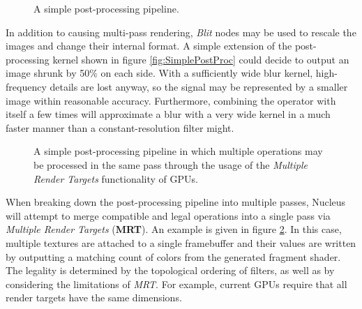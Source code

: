 \begin{figure}[h!]
  \centering
  \caption[Simple post-processing with breakdown]{A simple post-processing pipeline.}
\label{fig:SimplePostProcWithBreakdown}
\end{figure}

In addition to causing multi-pass rendering, \emph{Blit} nodes may be used to rescale the images and change their internal format. A simple extension of the post-processing kernel shown in figure \ref{fig:SimplePostProc} could decide to output an image shrunk by 50\% on each side. With a sufficiently wide blur kernel, high-frequency details are lost anyway, so the signal may be represented by a smaller image within reasonable accuracy. Furthermore, combining the operator with itself a few times will approximate a blur with a very wide kernel in a much faster manner than a constant-resolution filter might.

\begin{figure}[h!]
  \centering
    \caption[MRT usage in post-processing]{A simple post-processing pipeline in which multiple operations may be processed in the same pass through the usage of the \emph{Multiple Render Targets} functionality of GPUs.}
  \label{fig:PostProcMRT}
\end{figure}

When breaking down the post-processing pipeline into multiple passes, Nucleus will attempt to merge compatible and legal operations into a single pass via \emph{Multiple Render Targets} (\textbf{MRT}). An example is given in figure \ref{fig:PostProcMRT}. In this case, multiple textures are attached to a single framebuffer and their values are written by outputting a matching count of colors from the generated fragment shader. The legality is determined by the topological ordering of filters, as well as by considering the limitations of \emph{MRT}. For example, current GPUs require that all render targets have the same dimensions.

